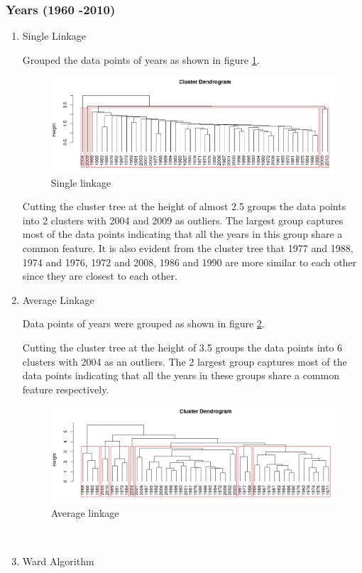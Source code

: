 \documentclass[12pt,a4paper]{article}
\begin{document}
\subsubsection{Years (1960 -2010)}
\begin{enumerate}[label=\roman*)]

\item Single Linkage

\noindent Grouped the data points of years as shown in figure \ref{fig:s2}.
\begin{figure}[h]
	\centering
	\includegraphics[width=0.7\linewidth]{S2}
	\caption{Single linkage}
	\label{fig:s2}
\end{figure}
Cutting the cluster tree at the height of almost 2.5 groups the data points into 2 clusters with 2004 and 2009 as outliers. The largest group captures most of the data points indicating that all the years in this group share a common feature. It is also evident from the cluster tree that 1977 and 1988, 1974 and 1976, 1972 and 2008, 1986 and 1990 are more similar to each other since they are closest to each other.\\

\item Average Linkage

\noindent Data points of years were grouped as shown in figure \ref{fig:A2}.

Cutting the cluster tree at the height of 3.5 groups the data points into 6 clusters with 2004 as an outliers. The 2 largest group captures most of the data points indicating that all the years in these groups share a common feature respectively.
\begin{figure}[h]
	\centering
	\includegraphics[width=0.7\linewidth]{A2}
	\caption{Average linkage}
	\label{fig:A2}
\end{figure}\\
\item Ward Algorithm


\end{enumerate}
\end{document}
